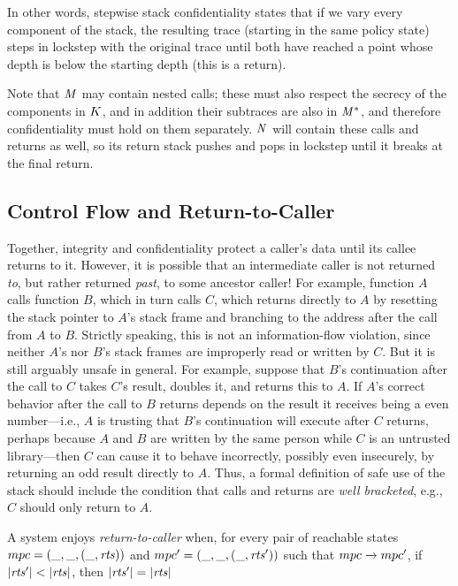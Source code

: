 \documentclass[acmsmall,review,anonymous]{acmart}\settopmatter{printfolios=true,printccs=false,printacmref=false}
\begin{document}

In other words, stepwise stack confidentiality states that if we vary every component of the stack,
the resulting trace (starting in the same policy state) steps in lockstep with the
original trace until both have reached a point whose depth is below the starting
depth (this is a return).

Note that \(\mathit{M}\) may contain nested calls; these must also respect the secrecy
of the components in \(K\), and in addition their subtraces are also in
\(\mathit{M}^*\), and therefore confidentiality must hold on them separately. \(\mathit{N}\)
will contain these calls and returns as well, so its return stack pushes and pops
in lockstep until it breaks at the final return.

\subsection{Control Flow and Return-to-Caller}
\label{sec:RTC}

Together,
integrity and confidentiality protect a caller's data until its callee
returns to it. However, it is possible that an intermediate caller is not
returned {\em to}, but rather returned {\em past}, to some ancestor caller!
For example, function $A$ calls function $B$, which in turn calls $C$, which
returns directly to $A$ by resetting the stack pointer to $A$'s stack frame
and branching to the address after the call from $A$ to $B$.  Strictly
speaking, this is not an information-flow violation, since neither $A$'s nor
$B$'s stack frames are improperly read or written by $C$.  But it is still
arguably unsafe in general.  For example, suppose that $B$'s continuation
after the call to $C$ takes $C$'s result, doubles it, and returns this to
$A$.  If $A$'s correct behavior after the call to $B$ returns depends on the
result it receives being a even number---i.e., $A$ is trusting that $B$'s
continuation will execute after $C$ returns, perhaps because $A$ and $B$ are
written by the same person while $C$ is an untrusted library---then $C$ can
cause it to behave incorrectly, possibly even insecurely, by returning an
odd result directly to $A$.
%
Thus, a formal definition of safe use of the stack should include the
condition that calls and returns are {\em well bracketed}, e.g., $C$ should
only return to $A$.  

A system enjoys {\em return-to-caller} when, for every pair of reachable states
\(mpc = (\_,\_,(\_,\mathit{rts}))\) and
\(mpc' = (\_,\_,(\_,\mathit{rts}'))\) such that
\(mpc \xrightarrow{} mpc'\), if \(|\mathit{rts}'| < |\mathit{rts}|\), then
\(|\mathit{rts}'| = |\mathit{rts}|\)
\end{document}
